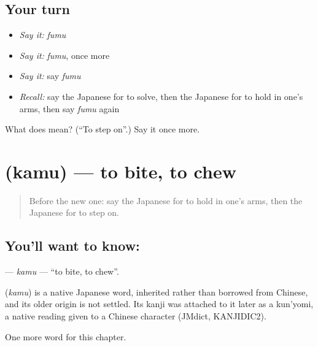 \subsection*{Your turn}
\begin{itemize}
\raggedright
  \item \emph{Say it:} \emph{fumu}
  \item \emph{Say it:} \emph{fumu}, once more
  \item \emph{Say it:} say \emph{fumu}
  \item \emph{Recall:} say the Japanese for to solve, then the Japanese for to hold in one's arms, then say \emph{fumu} again
\end{itemize}

\begin{tcolorbox}[breakable,colback=teal!4,colframe=teal!35!black,title={Before you move on}]
What does  mean? (\textquotedblleft{}To step on\textquotedblright{}.) Say it once more.
\end{tcolorbox}
\section[\texorpdfstring{\ja{かむ} (kamu)}{かむ (kamu)}]{ (kamu) — to bite, to chew}

\label{lesson:JA-C86-kamu}



\begin{quote}
Before the new one: say the Japanese for to hold in one's arms, then the Japanese for to step on.
\end{quote}

\subsection*{You'll want to know: }
\textbf{} — \emph{kamu} — \textquotedblleft{}to bite, to chew\textquotedblright{}.

\begin{cousinweb}
\textbf{} (\emph{kamu}) is a native Japanese word, inherited rather than borrowed from Chinese, and its older origin is not settled. Its kanji was attached to it later as a kun'yomi, a native reading given to a Chinese character (JMdict, KANJIDIC2).
\end{cousinweb}

\begin{grammarlens}[title={What you've built}]
One more word for this chapter.
\end{grammarlens}

